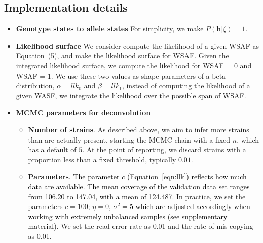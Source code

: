 \documentclass[9pt,lineno]{elife}
\begin{document}
\subsection{Implementation details}
\begin{itemize}
  \item {\bf Genotype states to allele states} For simplicity, we make $P(\mathbf{h} | \xi) = 1$.





  \item {\bf Likelihood surface} We consider compute the likelihood of a given WSAF as \cite{Zhu2017} Equation~(5), and make the likelihood surface for WSAF. Given the integrated likelihood surface, we compute the likelihood for WSAF = 0 and WSAF = 1. We use these two values as shape parameters of a beta distribution, $\alpha = llk_{0}$ and $\beta = llk_{1}$, instead of computing the likelihood of a given WASF, we integrate the likelihood over the possible span of WSAF.


\item {\bf MCMC parameters for deconvolution}

\begin{itemize}
\item {\bf Number of strains}. As described above, we aim to infer more strains than are actually present, starting the MCMC chain with a fixed $n$, which has a default of $5$. At the point of reporting, we discard strains with a proportion less than a fixed threshold, typically $0.01$.

\item {\bf Parameters}. \textcolor{black}{The parameter $c$ (Equation~\eqref{eqn:llk}) reflects how much data are available. The mean coverage of the validation data set ranges from 106.20 to 147.04, with a mean of 124.487.} In practice, we set the parameters $c=100$; $\eta = 0$, \textcolor{black}{$\sigma^2 = 5$ which are adjusted accordingly when working with extremely unbalanced samples (see \citet{Zhu2017} supplementary material)}.  We set the read error rate as 0.01 and the rate of mis-copying as 0.01.


\end{itemize}
\end{itemize}
\end{document}
